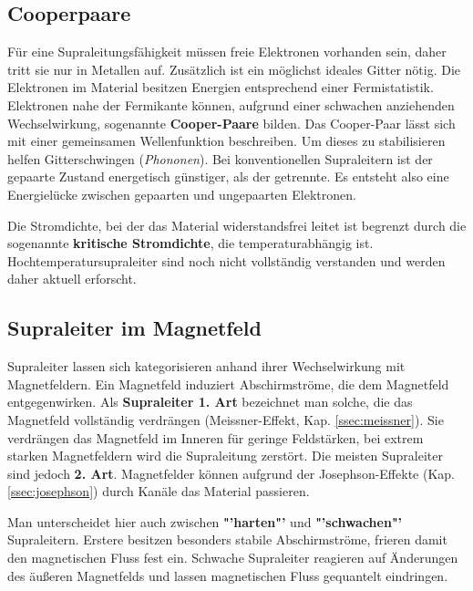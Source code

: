 \documentclass[a4paper,ngerman]{scrartcl}
\begin{document}
\subsection{Cooperpaare}

Für eine Supraleitungsfähigkeit müssen freie Elektronen vorhanden sein, daher tritt sie nur in Metallen auf.
Zusätzlich ist ein möglichst ideales Gitter nötig.
Die Elektronen im Material besitzen Energien entsprechend einer Fermistatistik.
Elektronen nahe der Fermikante können, aufgrund einer schwachen anziehenden Wechselwirkung, sogenannte \textbf{Cooper-Paare} bilden.
Das Cooper-Paar lässt sich mit einer gemeinsamen Wellenfunktion beschreiben. 
Um dieses zu stabilisieren helfen Gitterschwingen (\textit{Phononen}). 
Bei konventionellen Supraleitern ist der gepaarte Zustand energetisch günstiger, als der getrennte.
Es entsteht also eine Energielücke zwischen gepaarten und ungepaarten Elektronen. 

Die Stromdichte, bei der das Material widerstandsfrei leitet ist begrenzt durch die sogenannte \textbf{kritische Stromdichte}, die temperaturabhängig ist.
Hochtemperatursupraleiter sind noch nicht vollständig verstanden und werden daher aktuell erforscht.



\subsection{Supraleiter im Magnetfeld}

Supraleiter lassen sich kategorisieren anhand ihrer Wechselwirkung mit Magnetfeldern. 
Ein Magnetfeld induziert Abschirmströme, die dem Magnetfeld entgegenwirken.
Als \textbf{Supraleiter 1. Art} bezeichnet man solche, die das Magnetfeld vollständig verdrängen (Meissner-Effekt, Kap. \ref{ssec:meissner}).  
Sie verdrängen das Magnetfeld im Inneren für geringe Feldstärken, bei extrem starken Magnetfeldern wird die Supraleitung zerstört.
Die meisten Supraleiter sind jedoch \textbf{2. Art}.
Magnetfelder können aufgrund der Josephson-Effekte (Kap. \ref{ssec:josephson}) durch Kanäle das Material passieren.

Man unterscheidet hier auch zwischen \textbf{"'harten"'} und \textbf{"'schwachen"'} Supraleitern.
Erstere besitzen besonders stabile Abschirmströme, frieren damit den magnetischen Fluss fest ein.
Schwache Supraleiter reagieren auf Änderungen des äußeren Magnetfelds und lassen magnetischen Fluss gequantelt eindringen. 
\end{document}
